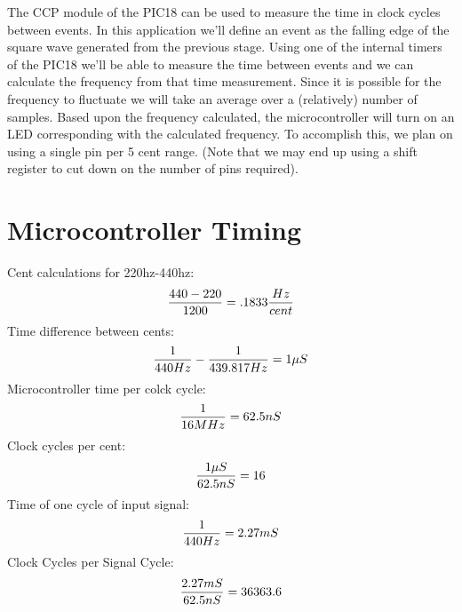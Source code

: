 \documentclass[12pt]{article}
\begin{document}
The CCP module of the PIC18 can be used to measure the time in clock cycles between events. In this
application we'll define an event as the falling edge of the square wave generated from the previous
stage. Using one of the internal timers of the PIC18 we'll be able to measure the time between events
and we can calculate the frequency from that time measurement. Since it is possible for the frequency
to fluctuate we will take an average over a (relatively) number of samples. Based upon the frequency
calculated, the microcontroller will turn on an LED corresponding with the calculated frequency. To
accomplish this, we plan on using a single pin per 5 cent range. (Note that we may end up using a shift
register to cut down on the number of pins required).

\section{Microcontroller Timing}
Cent calculations for 220hz-440hz:
\begin{equation}
{{440 - 220} \over 1200} = .1833 {Hz \over cent}
\end{equation}
Time difference between cents:
\begin{equation}
{1 \over 440 Hz} - {1 \over 439.817 Hz} = 1\mu S
\end{equation}
Microcontroller time per colck cycle:
\begin{equation}
{1 \over 16 MHz} = 62.5nS
\end{equation}
Clock cycles per cent:
\begin{equation}
{1\mu S \over 62.5 nS} = 16
\end{equation}
Time of one cycle of input signal:
\begin{equation}
{1 \over 440 Hz} = 2.27 mS
\end{equation}
Clock Cycles per Signal Cycle:
\begin{equation}
{2.27 mS \over 62.5 nS} = 36363.6
\end{equation}
\end{document}
